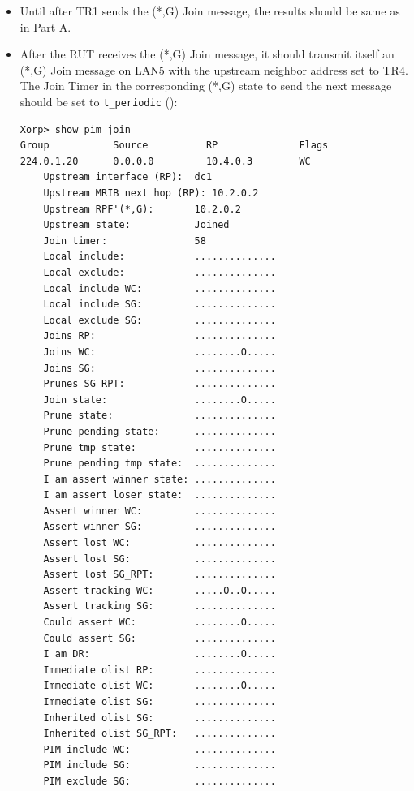 \documentclass[11pt]{report}
\begin{document}

\begin{itemize}

  \item Until after TR1 sends the (*,G) Join message, the results should be
  same as in Part A.

  \item After the RUT receives the (*,G) Join message, it should
  transmit itself an (*,G) Join message on LAN5 with the upstream
  neighbor address set to TR4. The Join Timer in the corresponding (*,G)
  state to send the next message should be set to \verb=t_periodic=
  ({\PimsmTPeriodic}):

\begin{verbatim}
Xorp> show pim join 
Group           Source          RP              Flags
224.0.1.20      0.0.0.0         10.4.0.3        WC   
    Upstream interface (RP):  dc1
    Upstream MRIB next hop (RP): 10.2.0.2
    Upstream RPF'(*,G):       10.2.0.2
    Upstream state:           Joined 
    Join timer:               58
    Local include:            ..............
    Local exclude:            ..............
    Local include WC:         ..............
    Local include SG:         ..............
    Local exclude SG:         ..............
    Joins RP:                 ..............
    Joins WC:                 ........O.....
    Joins SG:                 ..............
    Prunes SG_RPT:            ..............
    Join state:               ........O.....
    Prune state:              ..............
    Prune pending state:      ..............
    Prune tmp state:          ..............
    Prune pending tmp state:  ..............
    I am assert winner state: ..............
    I am assert loser state:  ..............
    Assert winner WC:         ..............
    Assert winner SG:         ..............
    Assert lost WC:           ..............
    Assert lost SG:           ..............
    Assert lost SG_RPT:       ..............
    Assert tracking WC:       .....O..O.....
    Assert tracking SG:       ..............
    Could assert WC:          ........O.....
    Could assert SG:          ..............
    I am DR:                  ........O.....
    Immediate olist RP:       ..............
    Immediate olist WC:       ........O.....
    Immediate olist SG:       ..............
    Inherited olist SG:       ..............
    Inherited olist SG_RPT:   ..............
    PIM include WC:           ..............
    PIM include SG:           ..............
    PIM exclude SG:           ..............
\end{verbatim}


\end{itemize}
\end{document}
